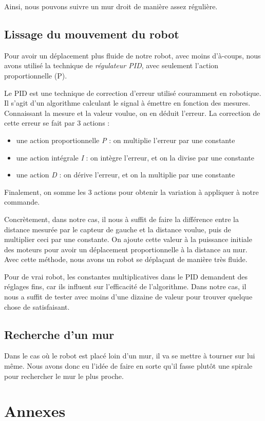 \documentclass{scrartcl}
\begin{document}
Ainsi, nous pouvons suivre un mur droit de manière assez régulière.

\subsection{Lissage du mouvement du robot}

Pour avoir un déplacement plus fluide de notre robot, avec moins
d'à-coups, nous avons utilisé la technique de \emph{régulateur PID},
avec seulement l'action proportionnelle (P).

Le PID est une technique de correction d'erreur utilisé couramment en
robotique. Il s'agit d'un algorithme calculant le signal à émettre
en fonction des mesures. Connaissant la mesure et la valeur voulue,
on en déduit l'erreur. La correction de cette erreur se fait par 3
actions :

\begin{itemize}
    \item une action proportionnelle \textit{P} : on multiplie l'erreur par une constante
    \item une action intégrale \textit{I} : on intègre l'erreur, et on la divise par une constante
    \item une action \textit{D} : on dérive l'erreur, et on la multiplie par une constante
\end{itemize}

Finalement, on somme les 3 actions pour obtenir la variation à appliquer à notre
commande.

Concrètement, dans notre cas, il nous à suffit de faire la différence entre
la distance mesurée par le capteur de gauche et la distance voulue, puis
de multiplier ceci par une constante. On ajoute cette valeur à la puissance initiale
des moteurs pour avoir un déplacement proportionnelle à la distance au mur.
Avec cette méthode, nous avons un robot se déplaçant de manière très fluide.

Pour de vrai robot, les constantes multiplicatives dans le PID demandent des réglages
fins, car ils influent sur l'efficacité de l'algorithme. Dans notre cas, il nous
a suffit de tester avec moins d'une dizaine de valeur pour trouver quelque chose
de satisfaisant.

\subsection{Recherche d'un mur}

Dans le cas où le robot est placé loin d'un mur, il va se mettre à tourner sur lui même.
Nous avons donc eu l'idée de faire en sorte qu'il fasse plutôt une spirale pour
rechercher le mur le plus proche.

\section{Annexes}
\lstlistoflistings

\end{document}

